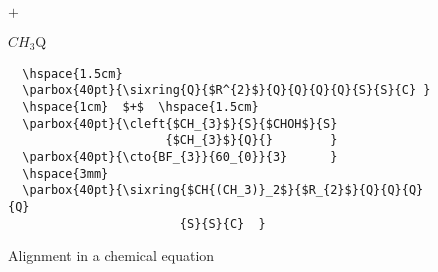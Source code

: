  \begin{figure}
  \hspace{1.5cm}
  \parbox{40pt}{ }
  \hspace{1cm} $+$ \hspace{1.5cm}
  \parbox{40pt}{                 
                      {$CH_{3}$}{Q}{}  }
  \parbox{40pt}{ }  
  \hspace{3mm}
  \parbox{40pt}{ }
 
  \begin{minipage}{14cm}
  \begin{verbatim}
  \hspace{1.5cm}
  \parbox{40pt}{\sixring{Q}{$R^{2}$}{Q}{Q}{Q}{Q}{S}{S}{C} }
  \hspace{1cm}  $+$  \hspace{1.5cm}
  \parbox{40pt}{\cleft{$CH_{3}$}{S}{$CHOH$}{S}
                      {$CH_{3}$}{Q}{}        }
  \parbox{40pt}{\cto{BF_{3}}{60_{0}}{3}      }
  \hspace{3mm}
  \parbox{40pt}{\sixring{$CH{(CH_3)}_2$}{$R_{2}$}{Q}{Q}{Q}{Q}
                        {S}{S}{C}  }
  \end{verbatim}
  \end{minipage}
 
  \caption{Alignment in a chemical equation}
 \end{figure}
 
 
